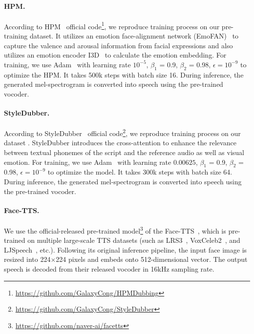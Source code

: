 \paragraph{HPM.~~\xspace}
According to HPM~\cite{visualvoicecloning/Cong0QZWWJ0H23} official code\footnote{\href{https://github.com/GalaxyCong/HPMDubbing}{https://github.com/GalaxyCong/HPMDubbing}}, we reproduce training process on our pre-training dataset. 
It utilizes an emotion face-alignment network (EmoFAN)~\cite{emofan/ToisoulKBTP21} to capture the valence and arousal information from facial expressions and also utilizes an emotion encoder I3D~\cite{i3d/CarreiraZ17} to calculate the emotion embedding. 
For training, we use Adam~\cite{adam/KingmaB14} with learning rate $10^{-5}$, $\beta_1$ = 0.9, $\beta_2$ = 0.98, $\epsilon = 10^{-9}$ to optimize the HPM. It takes 500k steps with batch size 16. During inference, the generated mel-spectrogram is converted into speech using the pre-trained vocoder.


\paragraph{StyleDubber.~~\xspace}
According to StyleDubber~\cite{styledubber:conf/acl/CongQLBZH00H24} official code\footnote{\href{https://github.com/GalaxyCong/StyleDubber}{https://github.com/GalaxyCong/StyleDubber}}, we reproduce training process on our dataset \datasetname. StyleDubber introduces the cross-attention to enhance the relevance between textual phonemes of the script and the reference audio as well as visual emotion.
For training, we use Adam~\cite{adam/KingmaB14} with learning rate $0.00625$, $\beta_1$ = 0.9, $\beta_2$ = 0.98, $\epsilon = 10^{-9}$ to optimize the model. It takes 300k steps with batch size 64. During inference, the generated mel-spectrogram is converted into speech using the pre-trained vocoder.


\paragraph{Face-TTS.~~\xspace}
We use the official-released pre-trained model\footnote{\href{https://github.com/naver-ai/facetts}{https://github.com/naver-ai/facetts}} of the Face-TTS~\cite{FaceTTS:conf/icassp/LeeCC23}, which is pre-trained on multiple large-scale TTS datasets (such as LRS3~\cite{LRS3/abs-1809-00496}, VoxCeleb2~\cite{VoxCeleb2:conf/interspeech/ChungNZ18}, and LJSpeech~\cite{ljspeech17}, etc.). 
Following its original inference pipeline, the input face image is resized into
224$\times$224 pixels and embeds onto 512-dimensional vector. The output speech is decoded from their released vocoder in 16kHz sampling rate.



